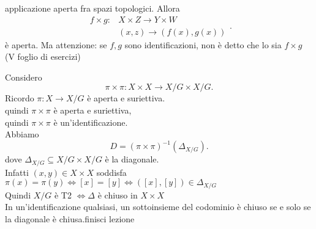 \documentclass[12px]{article}
\begin{document}
 applicazione aperta fra spazi topologici. Allora
 \[
 \begin{aligned}
	 f \times g : &X\times Z \rightarrow Y\times W\\
		      &(x,z) \rightarrow (f(x),g(x))
 \end{aligned}
 .\] 
 è aperta. Ma attenzione: se $f,g$ sono identificazioni, non è detto che lo sia $f\times g$ (V foglio di esercizi)
 \begin{dimo}
 	Considero
	\[
	\pi\times\pi:X\times X \rightarrow X/G\times X/G
	.\] 
	Ricordo $\pi:X \rightarrow X/G$ è aperta e suriettiva.\\
	quindi $\pi\times\pi$ è aperta e suriettiva,\\
	quindi  $\pi\times\pi$ è un'identificazione.\\
	Abbiamo
	\[
		D = (\pi\times\pi)^{-1}(\Delta_{X/G})
	.\] 
	dove $\Delta_{X/G}\subseteq X/G\times X/G$ è la diagonale.\\
	Infatti  $(x,y)\in X\times X$ soddisfa  $\pi(x) = \pi(y) \Leftrightarrow [x] = [y] \Leftrightarrow ([x],[y])\in\Delta_{X/G}$\\
	Quindi $X/G$ è T2 $ \Leftrightarrow \Delta $ è chiuso in $X\times X$\\
	In un'identificazione qualsiasi, un sottoinsieme del codominio è chiuso se e solo se la diagonale è chiusa.finisci lezione\\
 \end{dimo}
\end{document}
